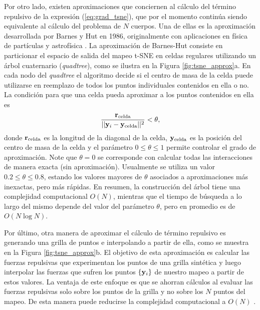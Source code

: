 Por otro lado, existen aproximaciones que conciernen al cálculo del término repulsivo de la expresión (\ref{eq:grad_tsne}), que por el momento continúa siendo equivalente al cálculo del problema de $N$ cuerpos. Una de ellas es la aproximación desarrollada por Barnes y Hut en 1986, originalmente con aplicaciones en física de partículas y astrofísica \cite{vdm_barnes-hut, barnes_hut_tree}. La aproximación de Barnes-Hut consiste en particionar el espacio de salida del mapeo t-SNE en celdas regulares utilizando un árbol cuaternario (\textit{quadtree}), como se ilustra en la Figura \ref{fig:tsne_approx}a. En cada nodo del \textit{quadtree} el algoritmo decide si el centro de masa de la celda puede utilizarse en reemplazo de todos los puntos individuales contenidos en ella o no. La condición para que una celda pueda aproximar a los puntos contenidos en ella es
\begin{equation}
    \frac{\vb{r}_{\mathrm{celda}}}{||\vb{y}_{i} - \vb{y}_{\mathrm{celda}}||^2} < \theta,
\end{equation}
donde $\vb{r}_{\mathrm{celda}}$ es la longitud de la diagonal de la celda, $\vb{y}_{\mathrm{celda}}$ es la posición del centro de masa de la celda y el parámetro $0 \leq \theta \leq 1$ permite controlar el grado de aproximación. Note que $\theta = 0$ se corresponde con calcular todas las interacciones de manera exacta (sin aproximación). Usualmente se utiliza un valor $0.2 \leq \theta \leq 0.8$, estando los valores mayores de $\theta$ asociados a aproximaciones más inexactas, pero más rápidas. En resumen, la construcción del árbol tiene una complejidad computacional $O(N)$, mientras que el tiempo de búsqueda a lo largo del mismo depende del valor del parámetro $\theta$, pero en promedio es de $O(N\log N)$.

Por último, otra manera de aproximar el cálculo de término repulsivo es generando una grilla de puntos e interpolando a partir de ella, como se muestra en la Figura \ref{fig:tsne_approx}b. El objetivo de esta aproximación es calcular las fuerzas repulsivas que experimentan los puntos de una grilla sintética y luego interpolar las fuerzas que sufren los puntos $\{\vb{y}_i\}$ de nuestro mapeo a partir de estos valores. La ventaja de este enfoque es que se ahorran cálculos al evaluar las fuerzas repulsivas solo sobre los puntos de la grilla y no sobre los $N$ puntos del mapeo. De esta manera puede reducirse la complejidad computacional a $O(N)$ \cite{linderman_tsne}.

